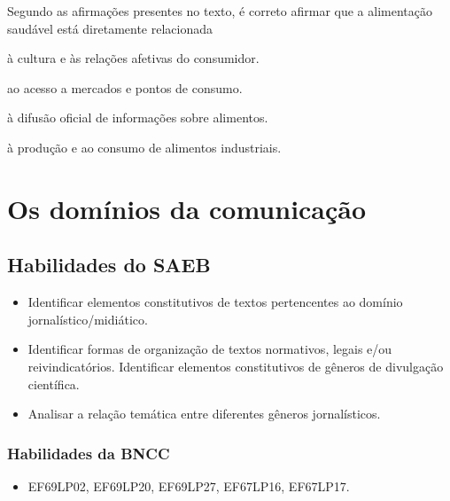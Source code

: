 Segundo as afirmações presentes no texto, é correto afirmar que a alimentação saudável
está diretamente relacionada

\begin{escolha}

  \item à cultura e às relações afetivas do consumidor.
  
  \item ao acesso a mercados e pontos de consumo.
  
  \item à difusão oficial de informações sobre alimentos.
  
  \item à produção e ao consumo de alimentos industriais.

\end{escolha}

\chapter{Os domínios da comunicação}

\section*{Habilidades do SAEB}

\begin{itemize}

  \item Identificar elementos constitutivos de textos pertencentes ao
domínio jornalístico/midiático.

  \item Identificar formas de organização de textos normativos, legais e/ou
reivindicatórios. Identificar elementos constitutivos de gêneros de
divulgação científica.

  \item Analisar a relação temática entre diferentes gêneros jornalísticos.

\end{itemize}

\subsection{Habilidades da BNCC}

\begin{itemize}
  
  \item EF69LP02, EF69LP20, EF69LP27, EF67LP16, EF67LP17.

\end{itemize}

